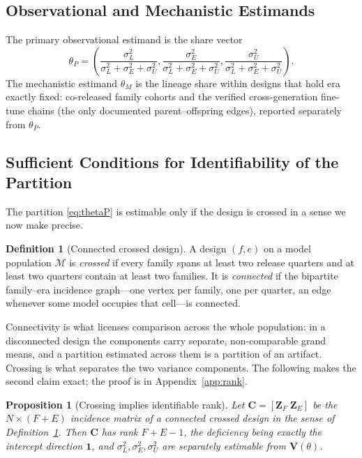 \documentclass{ieeeaccess}
\theoremstyle{definition}
\newtheorem{definition}{Definition}
\theoremstyle{plain}
\newtheorem{proposition}{Proposition}
\begin{document}
\subsection{Observational and Mechanistic Estimands}
The primary observational estimand is the share vector
\begin{equation}
\theta_{P} = \left(\frac{\sigma^{2}_{L}}{\sigma^{2}_{L}+\sigma^{2}_{E}+\sigma^{2}_{U}},
\frac{\sigma^{2}_{E}}{\sigma^{2}_{L}+\sigma^{2}_{E}+\sigma^{2}_{U}},
\frac{\sigma^{2}_{U}}{\sigma^{2}_{L}+\sigma^{2}_{E}+\sigma^{2}_{U}}\right).
\label{eq:thetaP}
\end{equation}
The mechanistic estimand $\theta_{M}$ is the lineage share within designs that hold
era exactly fixed: co-released family cohorts and the verified cross-generation
fine-tune chains (the only documented parent--offspring edges), reported separately
from $\theta_{P}$.

\subsection{Sufficient Conditions for Identifiability of the Partition}
The partition \eqref{eq:thetaP} is estimable only if the design is crossed in a
sense we now make precise.

\begin{definition}[Connected crossed design]
\label{def:crossed}
A design $(f,e)$ on a model population $\mathcal{M}$ is \emph{crossed} if every
family spans at least two release quarters and at least two quarters contain at
least two families. It is \emph{connected} if the bipartite family--era
incidence graph---one vertex per family, one per quarter, an edge whenever some
model occupies that cell---is connected.
\end{definition}

Connectivity is what licenses comparison across the whole population: in a
disconnected design the components carry separate, non-comparable grand means,
and a partition estimated across them is a partition of an artifact. Crossing
is what separates the two variance components. The following makes the second
claim exact; the proof is in Appendix~\ref{app:rank}.

\begin{proposition}[Crossing implies identifiable rank]
\label{prop:rank}
Let $\mathbf{C} = [\mathbf{Z}_{F}\;\mathbf{Z}_{E}]$ be the $N\times(F+E)$
incidence matrix of a connected crossed design in the sense of
Definition~\ref{def:crossed}. Then $\mathbf{C}$ has rank $F+E-1$, the deficiency
being exactly the intercept direction $\mathbf{1}$, and
$\sigma^{2}_{L},\sigma^{2}_{E},\sigma^{2}_{U}$ are separately estimable from
$\mathbf{V}(\theta)$.
\end{proposition}
\end{document}
